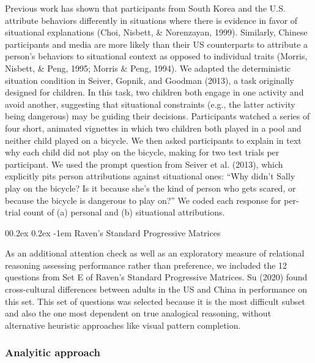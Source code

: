 \documentclass[
  man,floatsintext]{apa6}
\makeatletter
\let\oldparagraph\paragraph
\renewcommand{\paragraph}[1]{\oldparagraph{#1}\mbox{}}
\renewcommand{\paragraph}{\@startsection{paragraph}{4}{\parindent}%
  {0\baselineskip \@plus 0.2ex \@minus 0.2ex}%
  {-1em}%
  {\normalfont\normalsize\bfseries\itshape\typesectitle}}
\makeatother
\begin{document}
Previous work has shown that participants from South Korea and the U.S. attribute behaviors differently in situations where there is evidence in favor of situational explanations (Choi, Nisbett, \& Norenzayan, 1999). Similarly, Chinese participants and media are more likely than their US counterparts to attribute a person's behaviors to situational context as opposed to individual traits (Morris, Nisbett, \& Peng, 1995; Morris \& Peng, 1994). We adapted the deterministic situation condition in Seiver, Gopnik, and Goodman (2013), a task originally designed for children. In this task, two children both engage in one activity and avoid another, suggesting that situational constraints (e.g., the latter activity being dangerous) may be guiding their decisions. Participants watched a series of four short, animated vignettes in which two children both played in a pool and neither child played on a bicycle. We then asked participants to explain in text why each child did not play on the bicycle, making for two test trials per participant. We used the prompt question from Seiver et al. (2013), which explicitly pits person attributions against situational ones: ``Why didn't Sally play on the bicycle? Is it because she's the kind of person who gets scared, or because the bicycle is dangerous to play on?'' We coded each response for per-trial count of (a) personal and (b) situational attributions.

\hypertarget{ravens-standard-progressive-matrices}{%
\paragraph{Raven's Standard Progressive Matrices}\label{ravens-standard-progressive-matrices}}

As an additional attention check as well as an exploratory measure of relational reasoning assessing performance rather than preference, we included the 12 questions from Set E of Raven's Standard Progressive Matrices. Su (2020) found cross-cultural differences between adults in the US and China in performance on this set. This set of questions was selected because it is the most difficult subset and also the one most dependent on true analogical reasoning, without alternative heuristic approaches like visual pattern completion.

\hypertarget{analyitic-approach}{%
\subsubsection{Analyitic approach}\label{analyitic-approach}}
\end{document}
